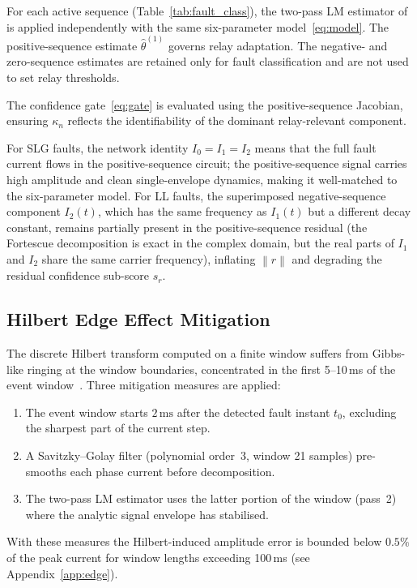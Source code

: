 \documentclass[journal,twoside,10pt]{IEEEtran}
\newcommand{\norm}[1]{\left\|#1\right\|}
\newcommand{\mss}{\,\text{ms}}
\begin{document}
For each active sequence (Table~\ref{tab:fault_class}), the two-pass LM
estimator of~\cite{EluvathingalPaperA} is applied independently with the
same six-parameter model~\eqref{eq:model}.
The positive-sequence estimate $\hat{\theta}^{(1)}$ governs relay adaptation.
The negative- and zero-sequence estimates are retained only for fault
classification and are not used to set relay thresholds.

The confidence gate~\eqref{eq:gate} is evaluated using the positive-sequence
Jacobian, ensuring $\kappa_n$ reflects the identifiability of the dominant
relay-relevant component.

For SLG faults, the network identity $I_0 = I_1 = I_2$ means that the
full fault current flows in the positive-sequence circuit; the positive-sequence
signal carries high amplitude and clean single-envelope dynamics, making it
well-matched to the six-parameter model.
For LL faults, the superimposed negative-sequence component $I_2(t)$, which
has the same frequency as $I_1(t)$ but a different decay constant, remains
partially present in the positive-sequence residual (the Fortescue
decomposition is exact in the complex domain, but the real parts of $I_1$
and $I_2$ share the same carrier frequency), inflating $\norm{r}$ and
degrading the residual confidence sub-score $s_r$.

\subsection{Hilbert Edge Effect Mitigation}
\label{sec:m3:edge}

The discrete Hilbert transform computed on a finite window suffers from
Gibbs-like ringing at the window boundaries, concentrated in the first
5--10\,ms of the event window~\cite{Oppenheim1999}.
Three mitigation measures are applied:
\begin{enumerate}
  \item The event window starts $2\mss$ after the detected fault instant
        $t_0$, excluding the sharpest part of the current step.
  \item A Savitzky--Golay filter (polynomial order~3, window 21 samples)
        pre-smooths each phase current before decomposition.
  \item The two-pass LM estimator uses the latter portion of the window
        (pass~2) where the analytic signal envelope has stabilised.
\end{enumerate}
With these measures the Hilbert-induced amplitude error is bounded below
$0.5\%$ of the peak current for window lengths exceeding 100\,ms
(see Appendix~\ref{app:edge}).
\end{document}

